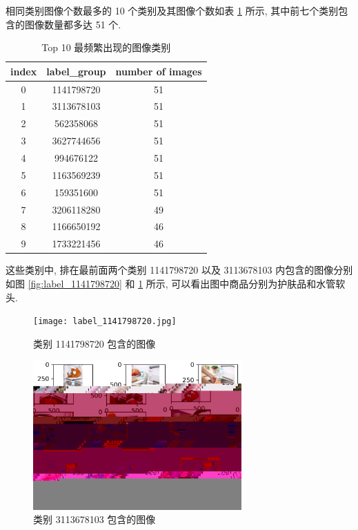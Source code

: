 \documentclass[12pt]{article}
\begin{document}
相同类别图像个数最多的 10 个类别及其图像个数如表 \ref{tab:most_frequent_label_groups} 所示, 其中前七个类别包含的图像数量都多达 51 个.

\begin{table}[htbp]
  \small
  \centering
  \caption{Top 10 最频繁出现的图像类别}
  \label{tab:most_frequent_label_groups}
  \begin{tabular}{ccc}
    \toprule
    index  & label\_group & number of images \\
    \midrule
    0 & 1141798720  & 51               \\
    1 & 3113678103  & 51               \\
    2 & 562358068   & 51               \\
    3 & 3627744656  & 51               \\
    4 & 994676122   & 51               \\
    5 & 1163569239  & 51               \\
    6 & 159351600   & 51               \\
    7 & 3206118280  & 49               \\
    8 & 1166650192  & 46               \\
    9 & 1733221456  & 46    \\
    \bottomrule          
  \end{tabular}
\end{table}

这些类别中, 排在最前面两个类别 1141798720 以及 3113678103 内包含的图像分别如图 \ref{fig:label_1141798720} 和 \ref{fig:label_3113678103} 所示, 可以看出图中商品分别为护肤品和水管软头.

\begin{figure}[htbp]
  \centering
  \begin{minipage}[t]{0.48\textwidth}
    \centering
    \texttt{[image: label\_1141798720.jpg]}
    \caption{类别 1141798720 包含的图像}
    \label{fig:label_1141798720}
  \end{minipage}
  \begin{minipage}[t]{0.48\textwidth}
    \centering
    \includegraphics[width=8cm]{label_3113678103.jpg}
    \caption{类别 3113678103 包含的图像}
    \label{fig:label_3113678103}
  \end{minipage}
\end{figure}
\end{document}
